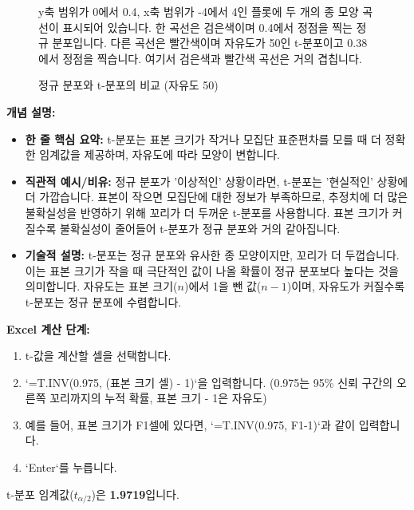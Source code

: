 \documentclass[11pt,a4paper]{article}
\begin{document}
\begin{figure}[h!]
    \centering
    \begin{tcolorbox}[colback=myyellow!10!white, colframe=myyellow!75!black, title=그림 설명: 정규 분포와 t-분포의 비교 (자유도 50)]
    y축 범위가 0에서 0.4, x축 범위가 -4에서 4인 플롯에 두 개의 종 모양 곡선이 표시되어 있습니다. 한 곡선은 검은색이며 0.4에서 정점을 찍는 정규 분포입니다. 다른 곡선은 빨간색이며 자유도가 50인 t-분포이고 0.38에서 정점을 찍습니다. 여기서 검은색과 빨간색 곡선은 거의 겹칩니다.
    \end{tcolorbox}
    \caption{정규 분포와 t-분포의 비교 (자유도 50)}
    \label{fig:normal_vs_t}
\end{figure}

\textbf{개념 설명:}
\begin{itemize}
    \item \textbf{한 줄 핵심 요약:} t-분포는 표본 크기가 작거나 모집단 표준편차를 모를 때 더 정확한 임계값을 제공하며, 자유도에 따라 모양이 변합니다.
    \item \textbf{직관적 예시/비유:} 정규 분포가 '이상적인' 상황이라면, t-분포는 '현실적인' 상황에 더 가깝습니다. 표본이 작으면 모집단에 대한 정보가 부족하므로, 추정치에 더 많은 불확실성을 반영하기 위해 꼬리가 더 두꺼운 t-분포를 사용합니다. 표본 크기가 커질수록 불확실성이 줄어들어 t-분포가 정규 분포와 거의 같아집니다.
    \item \textbf{기술적 설명:} t-분포는 정규 분포와 유사한 종 모양이지만, 꼬리가 더 두껍습니다. 이는 표본 크기가 작을 때 극단적인 값이 나올 확률이 정규 분포보다 높다는 것을 의미합니다. 자유도는 표본 크기($n$)에서 1을 뺀 값($n-1$)이며, 자유도가 커질수록 t-분포는 정규 분포에 수렴합니다.
\end{itemize}

\textbf{Excel 계산 단계:}
\begin{enumerate}
    \item t-값을 계산할 셀을 선택합니다.
    \item `=T.INV(0.975, (표본 크기 셀) - 1)`을 입력합니다. (0.975는 95\% 신뢰 구간의 오른쪽 꼬리까지의 누적 확률, 표본 크기 - 1은 자유도)
    \item 예를 들어, 표본 크기가 F1셀에 있다면, `=T.INV(0.975, F1-1)`과 같이 입력합니다.
    \item `Enter`를 누릅니다.
\end{enumerate}
\begin{tcolorbox}[colback=mygreen!10!white, colframe=mygreen!75!black, title=계산 결과: t-분포 임계값]
t-분포 임계값($t_{\alpha/2}$)은 \textbf{1.9719}입니다.
\end{tcolorbox}
\end{document}

